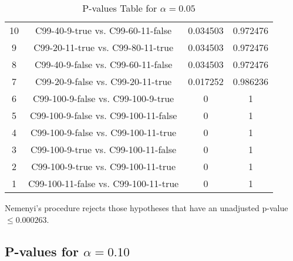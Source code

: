 \documentclass[a4paper,10pt]{article}
\begin{document}
\begin{landscape}
\begin{table}[!htp]
\begin{tabular}{cccc}
10&C99-40-9-true vs. C99-60-11-false&0.034503&0.972476\\
9&C99-20-11-true vs. C99-80-11-true&0.034503&0.972476\\
8&C99-40-9-false vs. C99-60-11-false&0.034503&0.972476\\
7&C99-20-9-false vs. C99-20-11-true&0.017252&0.986236\\
6&C99-100-9-false vs. C99-100-9-true&0&1\\
5&C99-100-9-false vs. C99-100-11-false&0&1\\
4&C99-100-9-false vs. C99-100-11-true&0&1\\
3&C99-100-9-true vs. C99-100-11-false&0&1\\
2&C99-100-9-true vs. C99-100-11-true&0&1\\
1&C99-100-11-false vs. C99-100-11-true&0&1\\
\hline
\end{tabular}
\caption{P-values Table for $\alpha=0.05$}
\end{table}Nemenyi's procedure rejects those hypotheses that have an unadjusted p-value $\le0.000263$.

\pagebreak

\subsection{P-values for $\alpha=0.10$}


\end{landscape}
\end{document}

